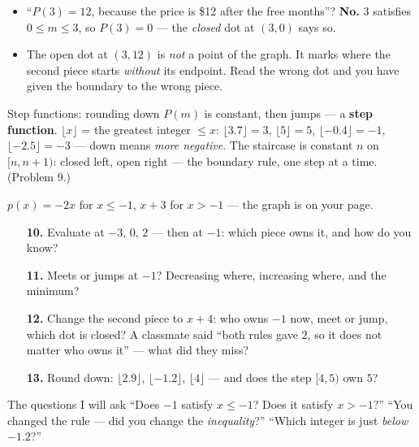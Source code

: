 \documentclass[aspectratio=169, 11pt]{beamer}
\begin{document}
\begin{frame}[t, plain]
  \begin{itemize}\setlength{\itemsep}{5pt}
    \item ``$P(3)=12$, because the price is \$12 after the free months''? \textbf{No.} $3$
          satisfies $0\le m\le3$, so $P(3)=0$ --- the \emph{closed} dot at $(3,0)$ says so.
    \item The open dot at $(3,12)$ is \emph{not} a point of the graph. It marks where the second
          piece starts \emph{without} its endpoint. Read the wrong dot and you have given the
          boundary to the wrong piece.
  \end{itemize}
  \vspace{3pt}
  \begin{block}{Step functions: rounding down}
    $P(m)$ is constant, then jumps --- a \textbf{step function}. $\lfloor x\rfloor$ = the greatest
    integer $\le x$: $\lfloor3.7\rfloor=3$, $\lfloor5\rfloor=5$, $\lfloor-0.4\rfloor=-1$,
    $\lfloor-2.5\rfloor=-3$ --- down means \emph{more negative}. The staircase is constant $n$ on
    $[n,n+1)$: closed left, open right --- the boundary rule, one step at a time. (Problem 9.)
  \end{block}
\end{frame}

\begin{frame}[t, plain]
  $p(x)=-2x$ for $x\le-1$, \; $x+3$ for $x>-1$ --- the graph is on your page.
  \begin{enumerate}\setlength{\itemsep}{4pt}
    \item[\textbf{10.}] Evaluate at $-3$, $0$, $2$ --- then at $-1$: which piece owns it, and
          how do you know?
    \item[\textbf{11.}] Meets or jumps at $-1$? Decreasing where, increasing where, and the
          minimum?
    \item[\textbf{12.}] Change the second piece to $x+4$: who owns $-1$ now, meet or jump, which
          dot is closed? A classmate said ``both rules gave $2$, so it does not matter who owns
          it'' --- what did they miss?
    \item[\textbf{13.}] Round down: $\lfloor2.9\rfloor$, $\lfloor-1.2\rfloor$, $\lfloor4\rfloor$
          --- and does the step $[4,5)$ own $5$?
  \end{enumerate}
  \vspace{4pt}
  \begin{block}{The questions I will ask}
    ``Does $-1$ satisfy $x\le-1$? Does it satisfy $x>-1$?'' \quad ``You changed the rule --- did
    you change the \emph{inequality}?'' \quad ``Which integer is just \emph{below} $-1.2$?''
  \end{block}
\end{frame}
\end{document}
